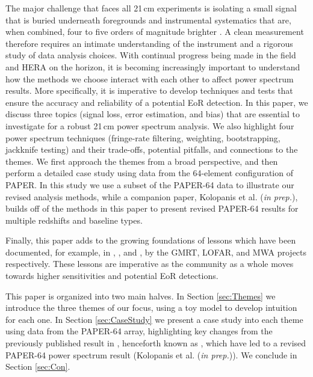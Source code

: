 \documentclass[preprint2,numberedappendix,tighten]{aastex6}  %
\begin{document}
The major challenge that faces all 21\,cm experiments is isolating a small signal that is buried underneath foregrounds and 
instrumental systematics that are, when combined, four to five orders of magnitude brighter \citep[e.g.,][]{santos_et_al2005, ali_et_al2008, deOliveiraCosta_et_al2008, jelic_et_al2008, bernardi_et_al2009, bernardi_et_al2010, ghosh_et_al2011, pober_et_al2013b, bernardi_et_al2013, dillon_et_al2014, kohn_et_al2016}. A clean measurement therefore requires an intimate understanding of the instrument and a rigorous study of data analysis choices. With continual progress being made 
in the field and HERA on the horizon, it is becoming increasingly important to understand how the methods we choose interact 
with each other to affect power spectrum results. More specifically, it is imperative to develop techniques and tests that ensure 
the accuracy and reliability of a potential EoR detection. In this paper, we discuss three topics (signal loss, error estimation, and bias) that are essential to investigate 
for a robust 21\,cm power spectrum analysis. We also highlight four power spectrum techniques (fringe-rate filtering, weighting, bootstrapping, jackknife testing) and their trade-offs, potential 
pitfalls, and connections to the themes. We first approach the themes from a broad perspective, and then perform a detailed 
case study using data from the 64-element configuration of PAPER. In this study we use a subset of the PAPER-64 data to illustrate our revised analysis methods, while a companion paper, Kolopanis et al. (\textit{in prep.}), builds off of the methods in this paper to present revised PAPER-64 results for multiple redshifts and baseline types.

Finally, this paper adds to the growing foundations of lessons which have been documented, for example, in \citet{Paciga2013}, \citet{Patil2016}, and \citet{Jacobs2016}, by the GMRT, LOFAR, and MWA projects respectively. These lessons are imperative as the community as a whole moves towards higher sensitivities and potential EoR detections.

This paper is organized into two main halves. In Section \ref{sec:Themes} we introduce the three themes of our focus, using a 
toy model to develop intuition for each one. In Section \ref{sec:CaseStudy} we present a case study into each theme using data 
from the PAPER-64 array, highlighting key changes from the previously published result in \citet{ali_et_al2015}, henceforth known as , which have led to a 
revised PAPER-64 power spectrum result (Kolopanis et al. (\textit{in prep.})). We conclude in Section \ref{sec:Con}.
\end{document}
